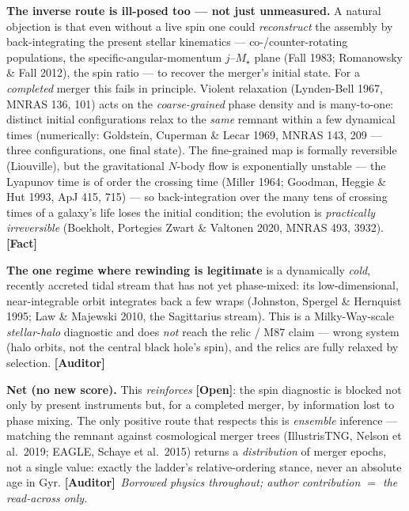 \documentclass[11pt]{article}
\newcommand{\Fact}{\textbf{\textcolor{green!45!black}{[Fact]}}}
\newcommand{\Open}{\textbf{\textcolor{gray!10!black}{[Open]}}}
\newcommand{\Auditor}{\textbf{\textcolor{teal!55!black}{[Auditor]}}}
\begin{document}
\medskip\noindent\textbf{The inverse route is ill-posed too --- not just unmeasured.} A natural objection is that even without a live spin one could \emph{reconstruct} the assembly by back-integrating the present stellar kinematics --- co-/counter-rotating populations, the specific-angular-momentum $j$--$M_\star$ plane (Fall 1983; Romanowsky \& Fall 2012), the spin ratio --- to recover the merger's initial state. For a \emph{completed} merger this fails in principle. Violent relaxation (Lynden-Bell 1967, MNRAS 136, 101) acts on the \emph{coarse-grained} phase density and is many-to-one: distinct initial configurations relax to the \emph{same} remnant within a few dynamical times (numerically: Goldstein, Cuperman \& Lecar 1969, MNRAS 143, 209 --- three configurations, one final state). The fine-grained map is formally reversible (Liouville), but the gravitational $N$-body flow is exponentially unstable --- the Lyapunov time is of order the crossing time (Miller 1964; Goodman, Heggie \& Hut 1993, ApJ 415, 715) --- so back-integration over the many tens of crossing times of a galaxy's life loses the initial condition; the evolution is \emph{practically irreversible} (Boekholt, Portegies Zwart \& Valtonen 2020, MNRAS 493, 3932). \Fact

\noindent\textbf{The one regime where rewinding is legitimate} is a dynamically \emph{cold}, recently accreted tidal stream that has not yet phase-mixed: its low-dimensional, near-integrable orbit integrates back a few wraps (Johnston, Spergel \& Hernquist 1995; Law \& Majewski 2010, the Sagittarius stream). This is a Milky-Way-scale \emph{stellar-halo} diagnostic and does \emph{not} reach the relic / M87 claim --- wrong system (halo orbits, not the central black hole's spin), and the relics are fully relaxed by selection. \Auditor

\noindent\textbf{Net (no new score).} This \emph{reinforces} \Open: the spin diagnostic is blocked not only by present instruments but, for a completed merger, by information lost to phase mixing. The only positive route that respects this is \emph{ensemble} inference --- matching the remnant against cosmological merger trees (IllustrisTNG, Nelson et al.\ 2019; EAGLE, Schaye et al.\ 2015) returns a \emph{distribution} of merger epochs, not a single value: exactly the ladder's relative-ordering stance, never an absolute age in Gyr. \Auditor\ \emph{Borrowed physics throughout; author contribution $=$ the read-across only.}
\end{document}
